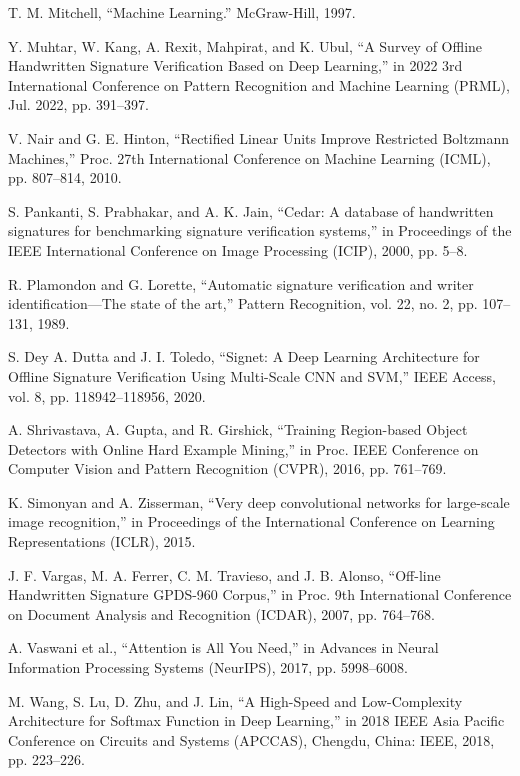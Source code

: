 \begin{thebibliography}{10}
T. M. Mitchell, ``Machine Learning.'' McGraw-Hill,
1997.

Y. Muhtar, W. Kang, A. Rexit, Mahpirat, and K. Ubul, ``A Survey of Offline Handwritten Signature Verification Based on Deep Learning,'' in 2022 3rd International Conference on Pattern Recognition and Machine Learning (PRML),
Jul. 2022, pp. 391--397.

V. Nair and G. E. Hinton, ``Rectified Linear Units Improve Restricted Boltzmann Machines,'' Proc. 27th International Conference on Machine Learning (ICML), pp. 807--814,
2010.

S. Pankanti, S. Prabhakar, and A. K. Jain, ``Cedar: A database of handwritten signatures for benchmarking signature verification systems,'' in Proceedings of the IEEE International Conference on Image Processing (ICIP),
2000, pp. 5--8.

R. Plamondon and G. Lorette, ``Automatic signature verification and writer identification—The state of the art,'' Pattern Recognition, vol. 22, no. 2, pp. 107--131,
1989.

S. Dey A. Dutta and J. I. Toledo, ``Signet: A Deep Learning Architecture for Offline Signature Verification Using Multi-Scale CNN and SVM,'' IEEE Access, vol. 8, pp. 118942--118956,
2020.

A. Shrivastava, A. Gupta, and R. Girshick, ``Training Region-based Object Detectors with Online Hard Example Mining,'' in Proc. IEEE Conference on Computer Vision and Pattern Recognition (CVPR),
2016, pp. 761--769.

K. Simonyan and A. Zisserman, ``Very deep convolutional networks for large-scale image recognition,'' in Proceedings of the International Conference on Learning Representations (ICLR),
2015.

J. F. Vargas, M. A. Ferrer, C. M. Travieso, and J. B. Alonso, ``Off-line Handwritten Signature GPDS-960 Corpus,'' in Proc. 9th International Conference on Document Analysis and Recognition (ICDAR),
2007, pp. 764--768.

A. Vaswani et al., ``Attention is All You Need,'' in Advances in Neural Information Processing Systems (NeurIPS),
2017, pp. 5998--6008.

M. Wang, S. Lu, D. Zhu, and J. Lin, ``A High-Speed and Low-Complexity Architecture for Softmax Function in Deep Learning,'' in 2018 IEEE Asia Pacific Conference on Circuits and Systems (APCCAS), Chengdu, China: IEEE,
2018, pp. 223--226.


\end{thebibliography}
